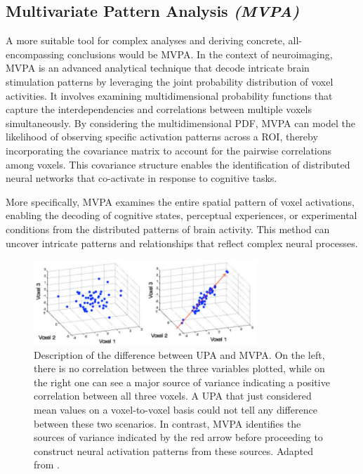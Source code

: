 \subsection{Multivariate Pattern Analysis \textit{(MVPA)}}

A more suitable tool for complex analyses and deriving concrete, all-encompassing conclusions would be \gls{MVPA}. In the context of neuroimaging, \gls{MVPA} is an advanced analytical technique that decode intricate brain stimulation patterns by leveraging the joint probability distribution of voxel activities. It involves examining multidimensional probability functions that capture the interdependencies and correlations between multiple voxels simultaneously. By considering the multidimensional \gls{PDF}, MVPA can model the likelihood of observing specific activation patterns across a \gls{ROI}, thereby incorporating the covariance matrix to account for the pairwise correlations among voxels. This covariance structure enables the identification of distributed neural networks that co-activate in response to cognitive tasks.

More specifically, \gls{MVPA} examines the entire spatial pattern of voxel activations, enabling the decoding of cognitive states, perceptual experiences, or experimental conditions from the distributed patterns of brain activity. This method can uncover intricate patterns and relationships that reflect complex neural processes.

\begin{figure}[htbp]
    \centering
    \includegraphics[width = 0.75\textwidth]{assets/images/Uni_vs_Multi.png}
    \caption[Illustration of the difference between MVPA and UPA]{Description of the difference between \gls{UPA} and \gls{MVPA}. On the left, there is no correlation between the three variables plotted, while on the right one can see a major source of variance indicating a positive correlation between all three voxels. A \gls{UPA} that just considered mean values on a voxel-to-voxel basis could not tell any difference between these two scenarios. In contrast, \gls{MVPA} identifies the sources of variance indicated by the red arrow before proceeding to construct neural activation patterns from these sources. Adapted from .}
    \label{fig:UvsM}
\end{figure}

